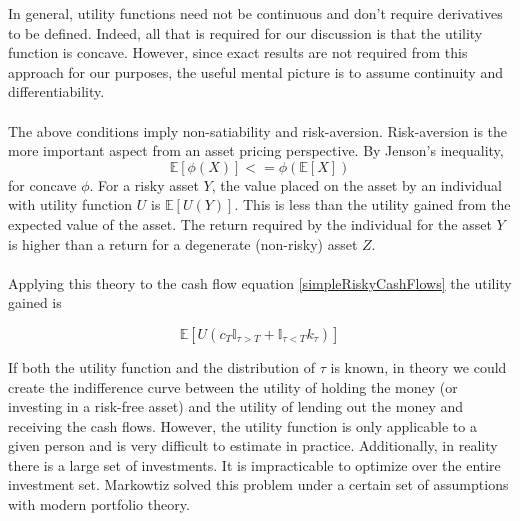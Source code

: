 \documentclass{article}
\theoremstyle{definition}
\begin{document}
In general, utility functions need not be continuous and don't require derivatives to be defined.  Indeed, all that is required for our discussion is that the utility function is concave.  However, since exact results are not required from this approach for our purposes, the useful mental picture is to assume continuity and differentiability.
\\
\\
The above conditions imply non-satiability and risk-aversion.  Risk-aversion is the more important aspect from an asset pricing perspective.  By Jenson's inequality, 
\[\mathbb{E}[\phi(X)]<=\phi(\mathbb{E}[X])\]
for concave \(\phi\).  For a risky asset \(Y\), the value placed on the asset by an individual with utility function \(U\) is \(\mathbb{E}[U(Y)]\).  This is less than the utility gained from the expected value of the asset.  The return required by the individual for the asset \(Y\) is higher than a return for a degenerate (non-risky) asset \(Z\).   
\\
\\
Applying this theory to the cash flow equation \ref{simpleRiskyCashFlows} the utility gained is

\[\mathbb{E}\left[U\left( c_T \mathbb{I}_{\tau>T}+\mathbb{I}_{\tau<T} k_\tau \right) \right]\]

If both the utility function and the distribution of \(\tau\) is known, in theory we could create the indifference curve between the utility of holding the money (or investing in a risk-free asset) and the utility of lending out the money and receiving the cash flows.  However, the utility function is only applicable to a given person and is very difficult to estimate in practice.  Additionally, in reality there is a large set of investments.  It is impracticable to optimize over the entire investment set.  Markowtiz solved this problem under a certain set of assumptions with modern portfolio theory.  
\end{document}
